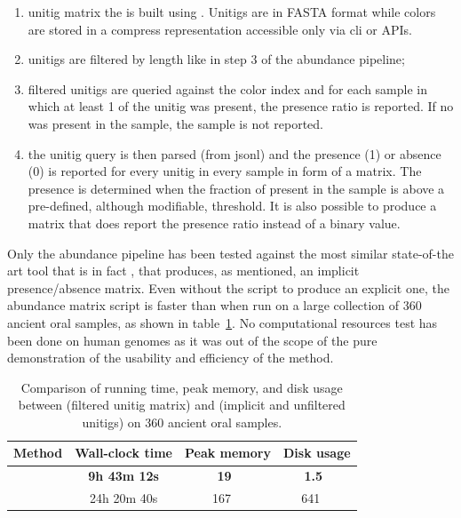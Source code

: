 \begin{enumerate}
	\item unitig matrix the \ccdbg is built using \ggcat. Unitigs are in FASTA format while colors are stored in a compress representation accessible only via \ggcat cli or APIs.
	\item unitigs are filtered by length like in step 3 of the abundance pipeline;
	\item filtered unitigs are queried against the \ggcat color index and for each sample in which at least 1 \kmer of the unitig was present, the presence ratio is reported. If no \kmer was present in the sample, the sample is not reported.
	\item the unitig query is then parsed (from jsonl) and the presence (1) or absence (0) is reported for every unitig in every sample in form of a matrix. The presence is determined when the fraction of present \kmers in the sample is above a pre-defined, although modifiable, threshold. It is also possible to produce a matrix that does report the presence ratio instead of a binary value.
\end{enumerate}
Only the abundance pipeline has been tested against the most similar state-of-the art tool that is in fact \ggcat, that produces, as mentioned, an implicit presence/absence matrix. Even without the \muset script to produce an explicit one, the abundance matrix script is faster than \ggcat when run on a large collection of 360 ancient oral samples, as shown in table~\ref{tab:muset_comparison}. No computational resources test has been done on human genomes as it was out of the scope of the pure demonstration of the usability and efficiency of the method. 

\begin{table}[!t]
	\centering
	\begin{tabular}{lccc}
		\toprule
		Method & Wall-clock time & Peak memory & Disk usage \\
		\midrule
		\muset & \textbf{9h 43m 12s} & \textbf{\SI[detect-weight=true]{19}{\textbf{\giga\byte}}} & \textbf{\SI[detect-weight=true]{1.5}{\textbf{\tera\byte}}}\\
		\ggcat & 24h 20m 40s & \SI{167}{\giga\byte} & \SI{641}{\giga\byte} \\
		\bottomrule
	\end{tabular}
	\caption{Comparison of running time, peak memory, and disk usage between \muset (filtered unitig matrix) and \ggcat (implicit and unfiltered unitigs) on 360 ancient oral samples.}\label{tab:muset_comparison}
\end{table}


